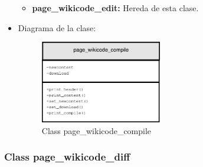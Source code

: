 \begin{itemize}
		\begin{itemize}
			\item \textbf{page\_wikicode\_edit:} Hereda de esta clase.
		\end{itemize}
	\item Diagrama de la clase:
		\begin{figure}[h]
			\centering
			\includegraphics[width=0.5\textwidth]{./img/page_wikicode_compile.eps}
			\caption{Class page\_wikicode\_compile}
		\end{figure}
\end{itemize}

\subsubsection{Class page\_wikicode\_diff}

